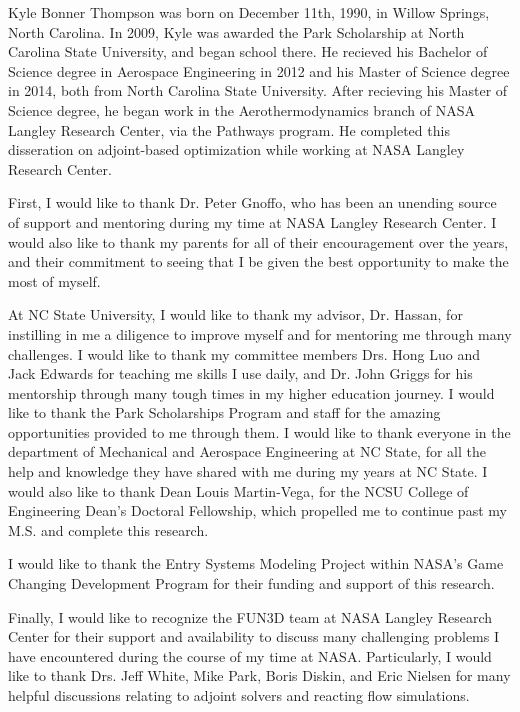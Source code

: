 \begin{biography}
Kyle Bonner Thompson was born on December 11th, 1990, in Willow Springs, North
Carolina.  In 2009, Kyle was awarded the Park Scholarship at North Carolina State
University, and began school there.  He recieved his Bachelor of Science degree
in Aerospace Engineering in 2012 and his Master of Science degree in 2014, both
from North Carolina State University.  After recieving his Master of Science
degree, he began work in the Aerothermodynamics branch of NASA Langley Research
Center, via the Pathways program.  He completed this disseration on
adjoint-based optimization while working at NASA Langley Research Center.
\end{biography}

\begin{acknowledgements}
First, I would like to thank Dr. Peter Gnoffo, who has been an unending source
of support and mentoring during my time at NASA Langley Research Center.  I
would also like to thank my parents for all of their encouragement over the
years, and their commitment to seeing that I be given the best opportunity to
make the most of myself.

At NC State University, I would like to thank my advisor, Dr. Hassan, for
instilling in me a diligence to improve myself and for mentoring me through many
challenges.  I would like to thank my committee members Drs. Hong Luo and Jack
Edwards for teaching me skills I use daily, and Dr. John Griggs for his
mentorship through many tough times in my higher education journey.  I would
like to thank the Park Scholarships Program and staff for the amazing
opportunities provided to me through them.  I would like to thank everyone in
the department of Mechanical and Aerospace Engineering at NC State, for all the
help and knowledge they have shared with me during my years at NC State.  I
would also like to thank Dean Louis Martin-Vega, for the NCSU College of
Engineering Dean's Doctoral Fellowship, which propelled me to continue past my
M.S. and complete this research.

I would like to thank the Entry Systems Modeling Project within NASA's Game
Changing Development Program for their funding and support of this research.  

Finally, I would like to recognize the FUN3D team at NASA Langley Research
Center for their support and availability to discuss many challenging problems
I have encountered during the course of my time at NASA.  Particularly, I would
like to thank Drs. Jeff White, Mike Park, Boris Diskin, and Eric Nielsen for
many helpful discussions relating to adjoint solvers and reacting flow
simulations.

\end{acknowledgements}

\thesistableofcontents

\thesislistoftables

\thesislistoffigures
